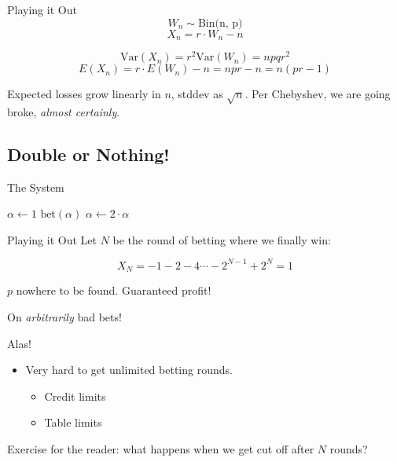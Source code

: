 \documentclass[pdf]{beamer}
\begin{document}
\begin{frame}{Playing it Out}
  \[ W_n \sim \text{Bin(n, p)} \]
  \[ X_n = r \cdot W_n - n\]

  \pause
  \[ \text{Var}(X_n) = r^2 \text{Var}(W_n) = npqr^2\]
  \[ E(X_n) = r\cdot E(W_n) - n = npr - n = n(pr -1) \]
  \pause

  Expected losses grow linearly in $n$, stddev as $\sqrt{n}$. Per Chebyshev, we
are going broke, \emph{almost certainly}.
\end{frame}

\subsection{Double or Nothing!}
\begin{frame}{The System}
  \begin{algorithmic}
    \State $\alpha \gets 1$
      \State $\text{bet}(\alpha)$
        \State \Return
      \Else
        \State $\alpha \gets 2 \cdot \alpha$
      \EndIf
    \EndWhile
    \EndProcedure
  \end{algorithmic}
\end{frame}

\begin{frame}{Playing it Out}
  Let $N$ be the round of betting where we finally win:

  \[ X_N = -1 - 2 - 4 \cdots -2^{N-1} + 2^N = 1 \]

  $p$ nowhere to be found. Guaranteed profit!

  \pause
  On \emph{arbitrarily} bad bets!
\end{frame}

\begin{frame}{Alas!}
  \begin{itemize}
  \item Very hard to get unlimited betting rounds.
    \begin{itemize}
    \item Credit limits
    \item Table limits
    \end{itemize}
  \end{itemize}

  \pause
  Exercise for the reader: what happens when we get cut off after $N$ rounds?
\end{frame}
\end{document}
